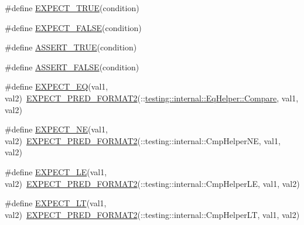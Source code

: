 \begin{DoxyCompactItemize}
\item 
\#define \mbox{\hyperlink{googletest-master_2googletest_2include_2gtest_2gtest_8h_ac33e7cdfb5d44a7a0f0ab552eb5c3c6a}{E\+X\+P\+E\+C\+T\+\_\+\+T\+R\+UE}}(condition)
\item 
\#define \mbox{\hyperlink{googletest-master_2googletest_2include_2gtest_2gtest_8h_aeb6c7ae89f440c90c1a1815951c836da}{E\+X\+P\+E\+C\+T\+\_\+\+F\+A\+L\+SE}}(condition)
\item 
\#define \mbox{\hyperlink{googletest-master_2googletest_2include_2gtest_2gtest_8h_ae9244bfbda562e8b798789b001993fa5}{A\+S\+S\+E\+R\+T\+\_\+\+T\+R\+UE}}(condition)
\item 
\#define \mbox{\hyperlink{googletest-master_2googletest_2include_2gtest_2gtest_8h_a8197fa52f3538588d20d8af4834c9003}{A\+S\+S\+E\+R\+T\+\_\+\+F\+A\+L\+SE}}(condition)
\item 
\#define \mbox{\hyperlink{googletest-master_2googletest_2include_2gtest_2gtest_8h_a4159019abda84f5366acdb7604ff220a}{E\+X\+P\+E\+C\+T\+\_\+\+EQ}}(val1,  val2)~\mbox{\hyperlink{_obj__test_2lib_2googletest-release-1_88_81_2googletest_2include_2gtest_2gtest__pred__impl_8h_af0141918615a5e2d5247e9cda8324dae}{E\+X\+P\+E\+C\+T\+\_\+\+P\+R\+E\+D\+\_\+\+F\+O\+R\+M\+A\+T2}}(\+::\mbox{\hyperlink{classtesting_1_1internal_1_1_eq_helper_a14dd80457029c1ab4a4d04f20003d237}{testing\+::internal\+::\+Eq\+Helper\+::\+Compare}}, val1, val2)
\item 
\#define \mbox{\hyperlink{googletest-master_2googletest_2include_2gtest_2gtest_8h_a6ae7443947f25abc58bfcfcfc56b0d75}{E\+X\+P\+E\+C\+T\+\_\+\+NE}}(val1,  val2)~\mbox{\hyperlink{_obj__test_2lib_2googletest-release-1_88_81_2googletest_2include_2gtest_2gtest__pred__impl_8h_af0141918615a5e2d5247e9cda8324dae}{E\+X\+P\+E\+C\+T\+\_\+\+P\+R\+E\+D\+\_\+\+F\+O\+R\+M\+A\+T2}}(\+::testing\+::internal\+::\+Cmp\+Helper\+NE, val1, val2)
\item 
\#define \mbox{\hyperlink{googletest-master_2googletest_2include_2gtest_2gtest_8h_ae0f265632323b4a07b585dcfde10f60a}{E\+X\+P\+E\+C\+T\+\_\+\+LE}}(val1,  val2)~\mbox{\hyperlink{_obj__test_2lib_2googletest-release-1_88_81_2googletest_2include_2gtest_2gtest__pred__impl_8h_af0141918615a5e2d5247e9cda8324dae}{E\+X\+P\+E\+C\+T\+\_\+\+P\+R\+E\+D\+\_\+\+F\+O\+R\+M\+A\+T2}}(\+::testing\+::internal\+::\+Cmp\+Helper\+LE, val1, val2)
\item 
\#define \mbox{\hyperlink{googletest-master_2googletest_2include_2gtest_2gtest_8h_af28c06b2b5e8dee151896f299f6610cf}{E\+X\+P\+E\+C\+T\+\_\+\+LT}}(val1,  val2)~\mbox{\hyperlink{_obj__test_2lib_2googletest-release-1_88_81_2googletest_2include_2gtest_2gtest__pred__impl_8h_af0141918615a5e2d5247e9cda8324dae}{E\+X\+P\+E\+C\+T\+\_\+\+P\+R\+E\+D\+\_\+\+F\+O\+R\+M\+A\+T2}}(\+::testing\+::internal\+::\+Cmp\+Helper\+LT, val1, val2)

\end{DoxyCompactItemize}
